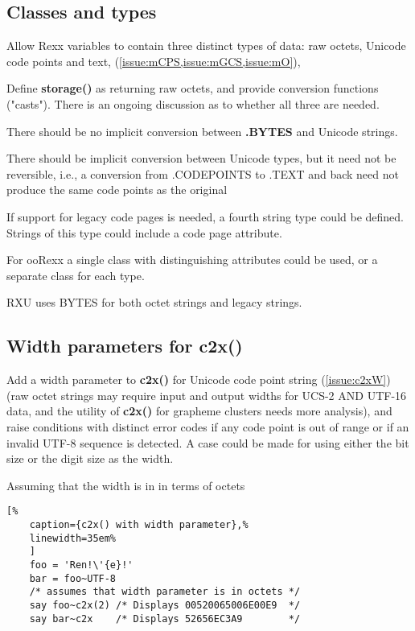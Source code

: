 \documentclass[b4paper]{article}
\begin{document}
\subsection{Classes and types}

Allow Rexx variables to contain three distinct types of data: raw octets, Unicode code points and text,
(\cref{issue:mCPS,issue:mGCS,issue:mO}),

Define \textbf{storage()} as returning raw octets,
and provide conversion functions ("casts").
There is an ongoing discussion as to whether all three are needed.

There should be no implicit conversion between \textbf{.BYTES} and Unicode strings.

There should be implicit conversion between Unicode types, but it need not be reversible, i.e.,
a conversion from .CODEPOINTS to .TEXT and back need not produce the same code points as the original

If support for legacy code pages is needed, a fourth string type could be defined.
Strings of this type could include a code page attribute.

For ooRexx a single class with distinguishing attributes could be
used, or a separate class for each type.

RXU uses BYTES for both octet strings and legacy strings.

\subsection{Width parameters for c2x()}

Add a width parameter to \textbf{c2x()} for Unicode code point string
(\cref{issue:c2xW})
(raw octet strings may require input and output widths for UCS-2 AND UTF-16 data, and the
utility of \textbf{c2x()} for grapheme clusters needs more
analysis), and raise conditions with distinct error codes if any code
point is out of range or if an invalid UTF-8 sequence is detected.  A
case could be made for using either the bit size or the digit size as
the width.

Assuming that the width is in in terms of octets
\begin{lstlisting}[%
    caption={c2x() with width parameter},%
    linewidth=35em%
    ]
    foo = 'Ren!\'{e}!'
    bar = foo~UTF-8
    /* assumes that width parameter is in octets */
    say foo~c2x(2) /* Displays 00520065006E00E9  */
    say bar~c2x    /* Displays 52656EC3A9        */
\end{lstlisting}
\end{document}
